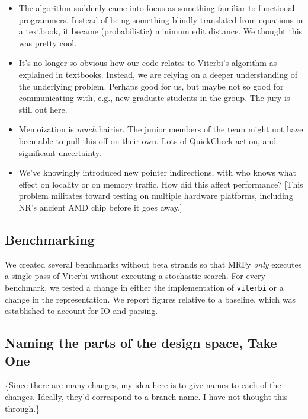\begin{itemize}
\item
  The algorithm suddenly came into focus as something familiar to
  functional programmers. Instead of being something blindly translated
  from equations in a textbook, it became (probabilistic) minimum edit
  distance. We thought this was pretty cool.
\item
  It's no longer so obvious how our code relates to Viterbi's algorithm
  as explained in textbooks. Instead, we are relying on a deeper
  understanding of the underlying problem. Perhaps good for us, but
  maybe not so good for communicating with, e.g., new graduate students
  in the group. The jury is still out here.
\item
  Memoization is \emph{much} hairier. The junior members of the team
  might not have been able to pull this off on their own. Lots of
  QuickCheck action, and significant uncertainty.
\item
  We've knowingly introduced new pointer indirections, with who knows
  what effect on locality or on memory traffic. How did this affect
  performance? {[}This problem militates toward testing on multiple
  hardware platforms, including NR's ancient AMD chip before it goes
  away.{]}
\end{itemize}

\subsection{Benchmarking}

We created several benchmarks without beta strands so that MRFy
\emph{only} executes a single pass of Viterbi without executing a
stochastic search. For every benchmark, we tested a change in either the
implementation of \texttt{viterbi} or a change in the representation. We
report figures relative to a baseline, which was established to account
for IO and parsing.

\subsection{Naming the parts of the design space, Take One}

\{Since there are many changes, my idea here is to give names to each of
the changes. Ideally, they'd correspond to a branch name. I have not
thought this through.\}

